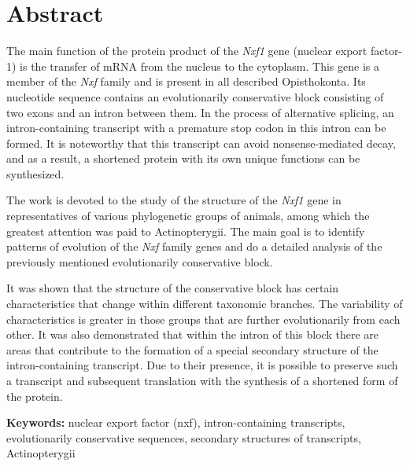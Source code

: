 \clearpage
\section*{Abstract}

The main function of the protein product of the \textit{Nxf1} gene (nuclear export factor-1) is the transfer of mRNA from the nucleus to the cytoplasm. This gene is a member of the \textit{Nxf} family and is present in all described Opisthokonta. Its nucleotide sequence contains an evolutionarily conservative block consisting of two exons and an intron between them. In the process of alternative splicing, an intron-containing transcript with a premature stop codon in this intron can be formed. It is noteworthy that this transcript can avoid nonsense-mediated decay, and as a result, a shortened protein with its own unique functions can be synthesized.

The work is devoted to the study of the structure of the \textit{Nxf1} gene in representatives of various phylogenetic groups of animals, among which the greatest attention was paid to Actinopterygii. The main goal is to identify patterns of evolution of the \textit{Nxf} family genes and do a detailed analysis of the previously mentioned evolutionarily conservative block.

It was shown that the structure of the conservative block has certain characteristics that change within different taxonomic branches. The variability of characteristics is greater in those groups that are further evolutionarily from each other. It was also demonstrated that within the intron of this block there are areas that contribute to the formation of a special secondary structure of the intron-containing transcript. Due to their presence, it is possible to preserve such a transcript and subsequent translation with the synthesis of a shortened form of the protein.

\vspace{1em}

\textbf{Keywords:} nuclear export factor (nxf), intron-containing transcripts, evolutionarily conservative sequences, secondary structures of transcripts, Actinopterygii